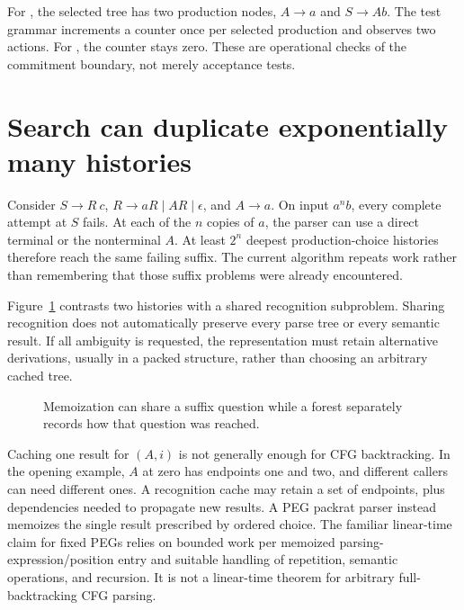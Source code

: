 For , the selected tree has two production nodes, $A\to a$ and $S\to Ab$.
The test grammar increments a counter once per selected production and observes two actions.
For , the counter stays zero.
These are operational checks of the commitment boundary, not merely acceptance tests.

\section{Search can duplicate exponentially many histories}
\label{sec:ch51-sharing}

Consider $S\to R\ c$, $R\to aR\mid AR\mid\epsilon$, and $A\to a$.
On input $a^n b$, every complete attempt at $S$ fails.
At each of the $n$ copies of $a$, the parser can use a direct terminal or the nonterminal $A$.
At least $2^n$ deepest production-choice histories therefore reach the same failing suffix.
The current algorithm repeats work rather than remembering that those suffix problems were already encountered.

Figure~\ref{fig:ch51-sharing} contrasts two histories with a shared recognition subproblem.
Sharing recognition does not automatically preserve every parse tree or every semantic result.
If all ambiguity is requested, the representation must retain alternative derivations, usually in a packed structure, rather than choosing an arbitrary cached tree.

\begin{figure}[htbp]
\centering
{}
\caption{Memoization can share a suffix question while a forest separately records how that question was reached.}
\label{fig:ch51-sharing}
\end{figure}

Caching one result for $(A,i)$ is not generally enough for CFG backtracking.
In the opening example, $A$ at zero has endpoints one and two, and different callers can need different ones.
A recognition cache may retain a set of endpoints, plus dependencies needed to propagate new results.
A PEG packrat parser instead memoizes the single result prescribed by ordered choice.
The familiar linear-time claim for fixed PEGs relies on bounded work per memoized parsing-expression/position entry and suitable handling of repetition, semantic operations, and recursion.
It is not a linear-time theorem for arbitrary full-backtracking CFG parsing.

